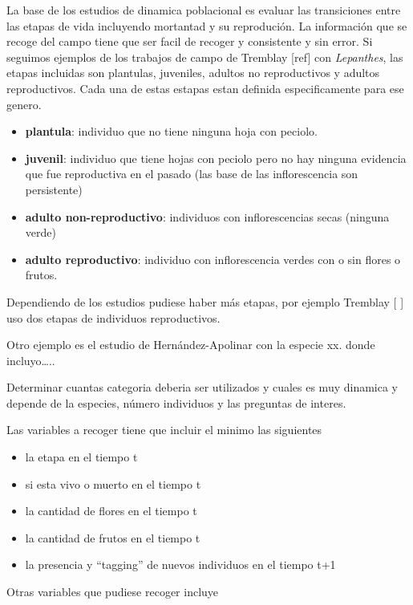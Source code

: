 \documentclass[
]{book}
\providecommand{\tightlist}{%
  \setlength{\itemsep}{0pt}\setlength{\parskip}{0pt}}
\theoremstyle{definition}
\theoremstyle{definition}
\theoremstyle{definition}
\theoremstyle{definition}
\theoremstyle{remark}
\begin{document}
La base de los estudios de dinamica poblacional es evaluar las transiciones entre las etapas de vida incluyendo mortantad y su reprodución. La información que se recoge del campo tiene que ser facil de recoger y consistente y sin error. Si seguimos ejemplos de los trabajos de campo de Tremblay {[}ref{]} con \emph{Lepanthes}, las etapas incluidas son plantulas, juveniles, adultos no reproductivos y adultos reproductivos. Cada una de estas estapas estan definida especificamente para ese genero.

\begin{itemize}
\tightlist
\item
  \textbf{plantula}: individuo que no tiene ninguna hoja con peciolo.
\item
  \textbf{juvenil}: individuo que tiene hojas con peciolo pero no hay ninguna evidencia que fue reproductiva en el pasado (las base de las inflorescencia son persistente)
\item
  \textbf{adulto non-reproductivo}: individuos con inflorescencias secas (ninguna verde)
\item
  \textbf{adulto reproductivo}: individuo con inflorescencia verdes con o sin flores o frutos.
\end{itemize}

Dependiendo de los estudios pudiese haber más etapas, por ejemplo Tremblay {[} {]} uso dos etapas de individuos reproductivos.

Otro ejemplo es el estudio de Hernández-Apolinar con la especie xx. donde incluyo\ldots..

Determinar cuantas categoria deberia ser utilizados y cuales es muy dinamica y depende de la especies, número individuos y las preguntas de interes.

Las variables a recoger tiene que incluir el minimo las siguientes

\begin{itemize}
\tightlist
\item
  la etapa en el tiempo t
\item
  si esta vivo o muerto en el tiempo t
\item
  la cantidad de flores en el tiempo t
\item
  la cantidad de frutos en el tiempo t
\item
  la presencia y ``tagging'' de nuevos individuos en el tiempo t+1
\end{itemize}

Otras variables que pudiese recoger incluye
\end{document}
